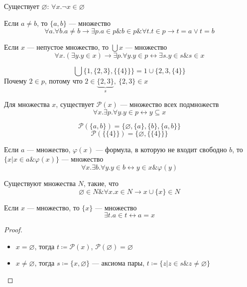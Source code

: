 \documentclass[oneside]{book}
\begin{document}
\begin{axiom}
	Существует \(\varnothing\): \(\forall x. \neg x \in \varnothing\)
	\label{orgbf986c5}
\end{axiom}
\begin{axiom}[пары]
	Если \(a \neq b\), то \(\{a, b\}\) --- множество
	\[ \forall a. \forall b. a\neq b \to \exists p. a \in p \& b\in p \& \forall t. t \in p \to t = a \vee t = b \]
	\label{orgf21e17e}
\end{axiom}
\begin{axiom}[объединения]
	Если \(x\) --- непустое множество, то \(\bigcup x\) --- множество
	\[ \forall x. (\exists y. y \in x) \to \exists p. \forall y. y\in p \leftrightarrow \exists s. y \in s \& s \in x \]
	\label{orgee4805f}
\end{axiom}
\begin{examp}
	\[ \bigcup \{1, \{2, 3\}, \{\{4\}\}\} = 1 \cup \{2, 3, \{4\}\}\]
	Почему \(2 \in p\), потому что \(2 \in \underbrace{\{2 , 3\}}_s,\ \{2, 3\} \in x\)
\end{examp}
\begin{axiom}[Степени]
	Для множества \(x\), существует \(\mathcal{P}(x)\) --- множество всех подмножеств
	\[ \forall x. \exists p. \forall y. y\in p \leftrightarrow y \subseteq x  \]
	\label{org4f8fec4}
\end{axiom}
\begin{examp}
	\[ \mathcal{P}(\{a, b\}) = \{\varnothing, \{a\}, \{b\}, \{a, b\}\} \]
	\[ \mathcal{P}(\{\{4\}\}) = \{\varnothing, \{\{4\}\}\} \]
\end{examp}
\begin{axiom}
	Если \(a\) --- множество, \(\varphi(x)\) --- формула, в которую не входит свободно \(b\), то \(\{x \big| x \in a \& \varphi(x)\}\) --- множество
	\[ \forall x. \exists b. \forall y. y \in b \leftrightarrow y \in x \& \varphi(y) \]
	\label{org2866311}
\end{axiom}
\begin{axiom}
	Существуют множества \(N\), такие, что
	\[ \varnothing \in N \& \forall x. x \in N \to x \cup \{x\} \in N \]
	\label{orga9a7442}
\end{axiom}
\begin{theorem}
	Если \(x\) --- множество, то \(\{x\}\) --- множество
	\[ \exists t. a \in t \leftrightarrow a = x \]
\end{theorem}
\begin{proof}
	\-
	\begin{itemize}
		\item \(x = \varnothing\), тогда \(t \coloneqq \mathcal{P}(x)\), \(\mathcal{P}(\varnothing) = \varnothing\)
		\item \(x \neq \varnothing\), тогда \(s \coloneqq \{x, \varnothing\}\) --- аксиома пары, \(t \coloneqq \{z \big| z \in s \& z \neq \varnothing\}\)
	\end{itemize}
	\label{orgdc91332}
\end{proof}
\end{document}
